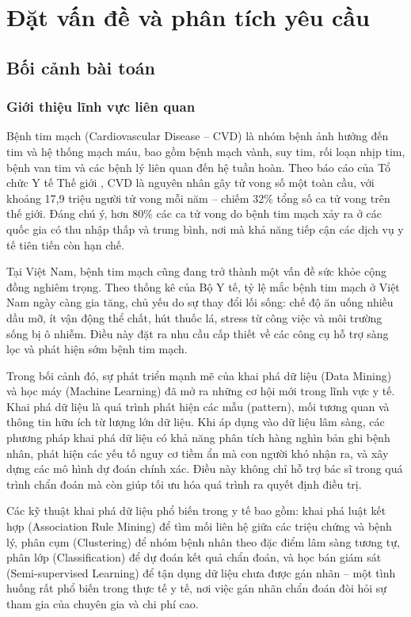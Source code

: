 \chapter{Đặt vấn đề và phân tích yêu cầu}\label{chapter_intro}

\section{Bối cảnh bài toán}

\subsection{Giới thiệu lĩnh vực liên quan}

Bệnh tim mạch (Cardiovascular Disease -- CVD) là nhóm bệnh ảnh hưởng đến tim và hệ thống mạch máu, bao gồm bệnh mạch vành, suy tim, rối loạn nhịp tim, bệnh van tim và các bệnh lý liên quan đến hệ tuần hoàn. Theo báo cáo của Tổ chức Y tế Thế giới \cite{who2021cvd}, CVD là nguyên nhân gây tử vong số một toàn cầu, với khoảng 17,9 triệu người tử vong mỗi năm -- chiếm 32\% tổng số ca tử vong trên thế giới. Đáng chú ý, hơn 80\% các ca tử vong do bệnh tim mạch xảy ra ở các quốc gia có thu nhập thấp và trung bình, nơi mà khả năng tiếp cận các dịch vụ y tế tiên tiến còn hạn chế.

Tại Việt Nam, bệnh tim mạch cũng đang trở thành một vấn đề sức khỏe cộng đồng nghiêm trọng. Theo thống kê của Bộ Y tế, tỷ lệ mắc bệnh tim mạch ở Việt Nam ngày càng gia tăng, chủ yếu do sự thay đổi lối sống: chế độ ăn uống nhiều dầu mỡ, ít vận động thể chất, hút thuốc lá, stress từ công việc và môi trường sống bị ô nhiễm. Điều này đặt ra nhu cầu cấp thiết về các công cụ hỗ trợ sàng lọc và phát hiện sớm bệnh tim mạch.

Trong bối cảnh đó, sự phát triển mạnh mẽ của khai phá dữ liệu (Data Mining) và học máy (Machine Learning) đã mở ra những cơ hội mới trong lĩnh vực y tế. Khai phá dữ liệu là quá trình phát hiện các mẫu (pattern), mối tương quan và thông tin hữu ích từ lượng lớn dữ liệu. Khi áp dụng vào dữ liệu lâm sàng, các phương pháp khai phá dữ liệu có khả năng phân tích hàng nghìn bản ghi bệnh nhân, phát hiện các yếu tố nguy cơ tiềm ẩn mà con người khó nhận ra, và xây dựng các mô hình dự đoán chính xác. Điều này không chỉ hỗ trợ bác sĩ trong quá trình chẩn đoán mà còn giúp tối ưu hóa quá trình ra quyết định điều trị.

Các kỹ thuật khai phá dữ liệu phổ biến trong y tế bao gồm: khai phá luật kết hợp (Association Rule Mining) để tìm mối liên hệ giữa các triệu chứng và bệnh lý, phân cụm (Clustering) để nhóm bệnh nhân theo đặc điểm lâm sàng tương tự, phân lớp (Classification) để dự đoán kết quả chẩn đoán, và học bán giám sát (Semi-supervised Learning) để tận dụng dữ liệu chưa được gán nhãn -- một tình huống rất phổ biến trong thực tế y tế, nơi việc gán nhãn chẩn đoán đòi hỏi sự tham gia của chuyên gia và chi phí cao.

